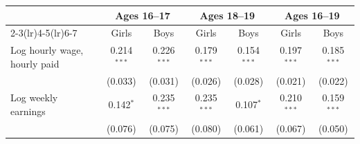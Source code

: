 \begin{tabular}{lcccccc}
\toprule
 & \multicolumn{2}{c}{Ages 16--17} & \multicolumn{2}{c}{Ages 18--19} & \multicolumn{2}{c}{Ages 16--19} \\
\cmidrule(lr){2-3}\cmidrule(lr){4-5}\cmidrule(lr){6-7}
 & Girls & Boys & Girls & Boys & Girls & Boys \\
\midrule
Log hourly wage, hourly paid & 0.214$^{***}$ & 0.226$^{***}$ & 0.179$^{***}$ & 0.154$^{***}$ & 0.197$^{***}$ & 0.185$^{***}$ \\
 & (0.033) & (0.031) & (0.026) & (0.028) & (0.021) & (0.022) \\
Log weekly earnings & 0.142$^{*}$ & 0.235$^{***}$ & 0.235$^{***}$ & 0.107$^{*}$ & 0.210$^{***}$ & 0.159$^{***}$ \\
 & (0.076) & (0.075) & (0.080) & (0.061) & (0.067) & (0.050) \\
\bottomrule
\end{tabular}
